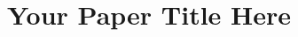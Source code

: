 \documentclass[sigconf]{Templates/ACM Conference Proceedings Primary Article Template/acmart}
\begin{document}
\title{Your Paper Title Here}





\maketitle




\newpage



% 
\end{document}
